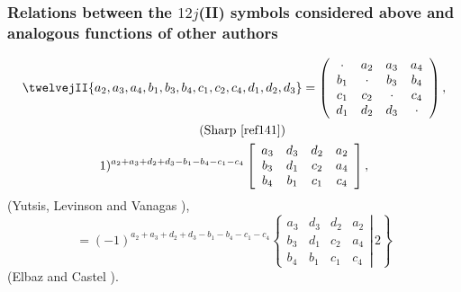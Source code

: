 \subsubsection{Relations between the $12j$(II) symbols considered above and analogous functions of other authors}
\[
\begin{gathered}
\twelvejII{a_{2},a_{3},a_{4},b_{1},b_{3},b_{4},c_{1},c_{2},c_{4},d_{1},d_{2},d_{3}}=\left(\begin{array}{cccc}
\cdot & a_{2} & a_{3} & a_{4} \\
b_{1} & \cdot & b_{3} & b_{4} \\
c_{1} & c_{2} & \cdot & c_{4} \\
d_{1} & d_{2} & d_{3} & \cdot
\end{array}\right), \\
\quad\text{ (Sharp \cite{ref141})} \\
1)^{a_{2}+a_{3}+d_{2}+d_{3}-b_{1}-b_{4}-c_{1}-c_{4}}\left[\begin{array}{cccc}
a_{3} & d_{3} & d_{2} & a_{2} \\
b_{3} & d_{1} & c_{2} & a_{4} \\
b_{4} & b_{1} & c_{1} & c_{4}
\end{array}\right],
\end{gathered}
\]
(Yutsis, Levinson and Vanagas \cite{ref044}),
\[
=(-1)^{a_{2}+a_{3}+d_{2}+d_{3}-b_{1}-b_{4}-c_{1}-c_{4}}\left\{\left.\begin{array}{cccc}
a_{3} & d_{3} & d_{2} & a_{2} \\
b_{3} & d_{1} & c_{2} & a_{4} \\
b_{4} & b_{1} & c_{1} & c_{4}
\end{array} \right\rvert\, 2\right\}
\]
(Elbaz and Castel \cite{ref017}).
